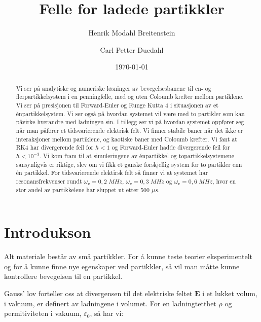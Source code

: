\documentclass[reprint,english,notitlepage, nofootinbib]{revtex4-1}  %
\begin{document}
\title{Felle for ladede partikkler}   %
\author{Henrik Modahl Breitenstein}
\author{Carl Petter Duedahl}
\date{\today}                             %
\noaffiliation                            %
\begin{abstract}                          %
	
Vi ser på analytiske og numeriske løsninger av bevegelsesbanene til en- og flerpartikkelsystem i en penningfelle, med og uten Coloumb krefter mellom partiklene. Vi ser på presisjonen til Forward-Euler og Runge Kutta 4 i situasjonen av et ènpartikkelsystem. Vi ser også på hvordan systemet vil være med to partikler som kan påvirke hverandre med ladningen sin. I tillegg ser vi på hvordan systemet oppfører seg når man påfører et tidsvarierende elektrisk felt. Vi finner stabile baner når det ikke er interaksjoner mellom partiklene, og kaotiske baner med Coloumb krefter. Vi fant at RK4 har divergerende feil for $h < 1$ og Forward-Euler hadde divergerende feil for $h < 10^{-3}$. Vi kom fram til at simuleringene av énpartikkel og topartikkelsystemene sansynligvis er riktige, slev om vi fikk et ganske forskjellig system for to partikler enn én partikkel. For tidsvarierende elektirsk felt så finner vi at systemet har resonansfrekvenser rundt $\omega_v = 0,2 \; MHz$, $\omega_v = 0,3 \; MHz$ og $\omega_v = 0,6 \; MHz$, hvor en stor andel av partikkelene har sluppet ut etter 500 $\mu s$.
	
\end{abstract}                            %
\maketitle                                %


\section{Introdukson}

Alt materiale består av små partikkler. For å kunne teste teorier eksperimentelt og for å kunne finne nye egenskaper ved partikkler, så vil man måtte kunne kontrollere bevegelsen til en partikkel. 

Gauss' lov forteller oss at divergensen til det elektriske feltet $\mathbf{E}$ i et lukket volum, i vakuum, er definert av ladningene i volumet. For en ladningtetthet $\rho$ og permitiviteten i vakuum, $\varepsilon_0$, så har vi:
\end{document}
